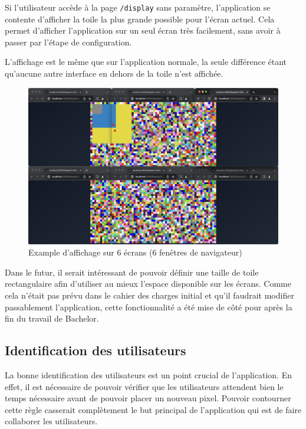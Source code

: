 Si l'utilisateur accède à la page \texttt{/display} sans paramètre, l'application se contente d'afficher la toile la plus grande possible pour l'écran actuel. Cela permet d'afficher l'application sur un seul écran très facilement, sans avoir à passer par l'étape de configuration.

L'affichage est le même que sur l'application normale, la seule différence étant qu'aucune autre interface en dehors de la toile n'est affichée.

\begin{figure}[H]
  \centering
  \includegraphics[width=1\textwidth]{./assets/figures/display-mode-example.png}
  \caption{Example d'affichage sur 6 écrans (6 fenêtres de navigateur)}
  \label{fig:display-mode-example}
\end{figure}

Dans le futur, il serait intéressant de pouvoir définir une taille de toile rectangulaire afin d'utiliser au mieux l'espace disponible sur les écrans. Comme cela n'était pas prévu dans le cahier des charges initial et qu'il faudrait modifier passablement l'application, cette fonctionnalité a été mise de côté pour après la fin du travail de Bachelor.

\subsection{Identification des utilisateurs}
La bonne identification des utilisateurs est un point crucial de l'application. En effet, il est nécessaire de pouvoir vérifier que les utilisateurs attendent bien le temps nécessaire avant de pouvoir placer un nouveau pixel. Pouvoir contourner cette règle casserait complètement le but principal de l'application qui est de faire collaborer les utilisateurs.

